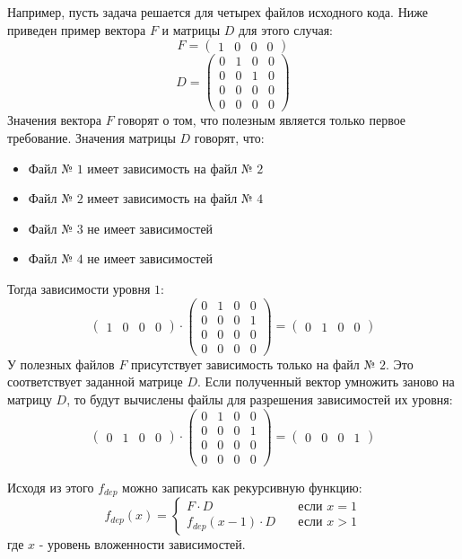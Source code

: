 Например, пусть задача решается для четырех файлов исходного кода. Ниже приведен пример вектора $F$ и матрицы $D$ для этого случая:
\begin{equation}
  F = \begin{pmatrix}
  1 & 0 & 0 & 0 
 \end{pmatrix}
\end{equation}
\begin{equation}
  D = \begin{pmatrix}
  0 & 1 & 0 & 0 \\
  0 & 0 & 1 & 0 \\
  0 & 0 & 0 & 0 \\
  0 & 0 & 0 & 0 
 \end{pmatrix}
\end{equation}
Значения вектора $F$ говорят о том, что полезным является только первое требование. Значения матрицы $D$ говорят, что:
\begin{itemize}
  \item Файл № $1$ имеет зависимость на файл № $2$
  \item Файл № $2$ имеет зависимость на файл № $4$
  \item Файл № $3$ не имеет зависимостей
  \item Файл № $4$ не имеет зависимостей
\end{itemize}
Тогда зависимости уровня $1$:
\begin{equation}
  \begin{pmatrix}
  1 & 0 & 0 & 0 
 \end{pmatrix}
 \cdot
 \begin{pmatrix}
  0 & 1 & 0 & 0 \\
  0 & 0 & 0 & 1 \\
  0 & 0 & 0 & 0 \\
  0 & 0 & 0 & 0 
 \end{pmatrix}
 = 
 \begin{pmatrix}
  0 & 1 & 0 & 0 
 \end{pmatrix}
\end{equation}
У полезных файлов $F$ присутствует зависимость только на файл № $2$. Это соответствует заданной матрице $D$. Если полученный вектор умножить заново на матрицу $D$, то будут вычислены файлы для разрешения зависимостей их уровня:
\begin{equation}
  \begin{pmatrix}
  0 & 1 & 0 & 0 
  \end{pmatrix}
  \cdot
  \begin{pmatrix}
  0 & 1 & 0 & 0 \\
  0 & 0 & 0 & 1 \\
  0 & 0 & 0 & 0 \\
  0 & 0 & 0 & 0 
 \end{pmatrix}
 = 
 \begin{pmatrix}
  0 & 0 & 0 & 1 
 \end{pmatrix}
\end{equation}

Исходя из этого $f_{dep}$ можно записать как рекурсивную функцию:
\begin{equation}
  f_{dep}(x) = 
  \begin{cases}
    F \cdot D & \quad \text{если } x = 1 \\
    f_{dep}(x - 1) \cdot D & \quad \text{если } x > 1
  \end{cases}
\end{equation}
где $x$ - уровень вложенности зависимостей.


